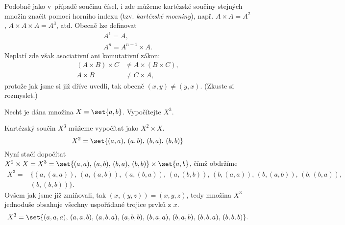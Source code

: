 Podobně jako v~případě součinu čísel, i zde můžeme kartézské součiny stejných množin značit pomocí horního indexu (tzv. \emph{kartézské mocniny}), např. $A\times A=A^2$, $A\times A\times A=A^3$, atd. Obecně lze definovat
\begin{align*}
    A^1=A,\\
    A^n=A^{n-1}\times A.
\end{align*}
Neplatí zde však asociativní ani komutativní zákon:
\begin{align*}
    (A\times B)\times C&\neq A\times (B\times C),\\
    A\times B&\neq C\times A,
\end{align*}
protože jak jsme si již dříve uvedli, tak obecně $(x,y)\neq (y,x)$. (Zkuste si rozmyslet.)
\begin{example}
    Nechť je dána množina $X=\set{a,b}$. Vypočítejte $X^3$.
\end{example}
\begin{solution}
    Kartézský součin $X^3$ můžeme vypočítat jako $X^2\times X$.
    \begin{equation*}
        X^2=\set{(a,a),\,(a,b),\,(b,a),\,(b,b)}
    \end{equation*}
    Nyní stačí dopočítat $X^2\times X=X^3=\set{(a,a),\,(a,b),\,(b,a),\,(b,b)}\times\set{a,b}$, čímž obdržíme
    \begin{align*}
        X^3=&\{(a,(a,a)),\,(a,(a,b)),\,(a,(b,a)),\,(a,(b,b)),\,(b,(a,a)),\,(b,(a,b)),\,(b,(b,a)),\\
        &(b,(b,b))\}.
    \end{align*}
    Ovšem jak jsme již zmiňovali, tak $(x,(y,z))=(x,y,z)$, tedy množina $X^3$ jednoduše obsahuje všechny uspořádané trojice prvků z $x$.
    \begin{equation*}
        X^3=\set{(a,a,a),\,(a,a,b),\,(a,b,a),\,(a,b,b),\,(b,a,a),\,(b,a,b),\,(b,b,a),\,(b,b,b)}.
    \end{equation*}
\end{solution}